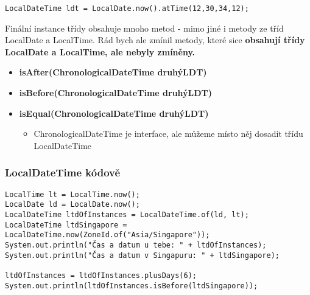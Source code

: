 \documentclass[11pt,a4paper,titlepage]{article}
\begin{document}
\begin{verbatim}
LocalDateTime ldt = LocalDate.now().atTime(12,30,34,12);
\end{verbatim}
Finální instance třídy obsahuje mnoho metod - mimo jiné i metody ze tříd LocalDate a LocalTime. Rád bych ale zmínil metody, které sice \textbf{obsahují třídy LocalDate a LocalTime, ale nebyly zmíněny.}
\begin{itemize}
    \item \textbf{isAfter(ChronologicalDateTime druhýLDT)}
    \item \textbf{isBefore(ChronologicalDateTime druhýLDT)}
    \item \textbf{isEqual(ChronologicalDateTime druhýLDT)}
    \begin{itemize}
        \item ChronologicalDateTime je interface, ale můžeme místo něj dosadit třídu LocalDateTime
    \end{itemize}
\end{itemize}
\parencite{java8_localdatetime}\newline
\subsubsection{LocalDateTime kódově}
\label{sec:ldt}
\begin{verbatim}
LocalTime lt = LocalTime.now();
LocalDate ld = LocalDate.now();
LocalDateTime ltdOfInstances = LocalDateTime.of(ld, lt);
LocalDateTime ltdSingapore = LocalDateTime.now(ZoneId.of("Asia/Singapore"));
System.out.println("Čas a datum u tebe: " + ltdOfInstances);
System.out.println("Čas a datum v Singapuru: " + ltdSingapore);

ltdOfInstances = ltdOfInstances.plusDays(6);
System.out.println(ltdOfInstances.isBefore(ltdSingapore));
\end{verbatim}
\end{document}
